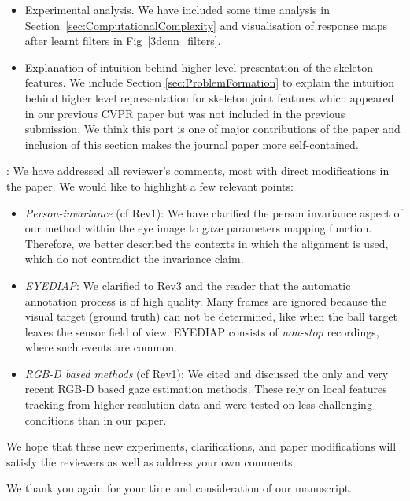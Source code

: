 \documentclass[12pt]{article}
\begin{document}
\begin{itemize}
\item Experimental analysis. We have included some time analysis in Section~\ref{sec:ComputationalComplexity} and visualisation of response maps after learnt filters in Fig~\ref{3dcnn_filters}.

\item Explanation of intuition behind higher level presentation of the skeleton features. We include Section \ref{sec:ProblemFormation} to explain the intuition behind higher level representation for skeleton joint features which appeared in our previous CVPR paper but was not included in the previous submission. We think this part is one of major contributions of the paper and inclusion of this section makes the journal paper more self-contained.
\end{itemize}

: We have addressed all reviewer's comments, most with direct modifications in the paper. We would like to
highlight a few relevant points:
\begin{itemize}
 \item {\em Person-invariance} (cf Rev1): We have clarified the person invariance aspect of our method within the eye image
 to gaze parameters mapping function. Therefore, we better described the contexts  in which the alignment is used,
 which do not contradict the invariance claim.
%
 \item {\em EYEDIAP}: We clarified to Rev3 and the reader that the automatic annotation process is of high quality. Many frames are ignored because
 the visual target (ground truth) can not be determined, like when the ball target leaves the sensor  field of view. EYEDIAP consists
 of {\em non-stop} recordings, where such events are common.
%
 \item {\em RGB-D based methods} (cf Rev1): We cited and discussed the only and very recent RGB-D based gaze estimation methods.
 These rely on local features tracking from higher resolution data and were tested on less challenging conditions than in our paper.
\end{itemize}

We hope that these new experiments, clarifications, and paper modifications will satisfy the reviewers as well as address your own comments. 

\vspace*{2mm}
We thank you again for your time and consideration of our manuscript.

\end{document}
